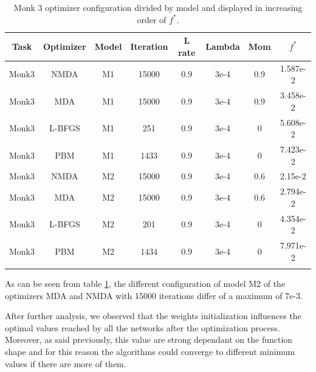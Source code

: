 \begin{longtable}{|c|c|c|c|c|c|c|c|}
	\hline
	\centering
	\textbf{Task}&\textbf{Optimizer}&\textbf{Model} &\textbf{Iteration} & \textbf{L rate} & \multicolumn{1}{l|}{\textbf{Lambda}} & \textbf{Mom} & \textbf{$f^{*}$} \\ \hline 
	Monk3 & NMDA & M1 & 15000 & 0.9 & 3e-4  & 0.9 & 1.587e-2 \\
	Monk3 & MDA & M1 & 15000 & 0.9 & 3e-4  & 0.9 & 3.458e-2 	\\
	Monk3 & L-BFGS & M1 & 251 & 0.9 & 3e-4  & 0 & 5.608e-2 		\\
	Monk3 & PBM & M1 & 1433 & 0.9 & 3e-4  & 0 & 7.423e-2 		\\
	Monk3 & NMDA & M2 & 15000 & 0.9 & 3e-4  & 0.6 & 2.15e-2 	\\
	Monk3 & MDA & M2 & 15000 & 0.9 & 3e-4  & 0.6 & 2.794e-2 	\\
	Monk3 & L-BFGS & M2 & 201 & 0.9 & 3e-4  & 0 & 4.354e-2 		\\
	Monk3 & PBM & M2 & 1434 & 0.9 & 3e-4  & 0 & 7.971e-2 		\\
	\hline
	\caption{Monk 3 optimizer configuration divided by model and displayed in increasing order of $f^*$.}
	\label{tab:nets_res_plots_Monk3}
\end{longtable}

As can be seen from table \ref{tab:nets_res_plots_Monk3}, the different configuration of model M2 of the optimizers MDA and NMDA with 15000 iterations differ of a maximum of 7e-3. 

After further analysis, we observed that the weights initialization influences the  optimal values reached by all the networks after the optimization process. Moreover, as said previously, this value are strong dependant on the function shape and for this reason the algorithms could converge to different minimum values if there are more of them. 

